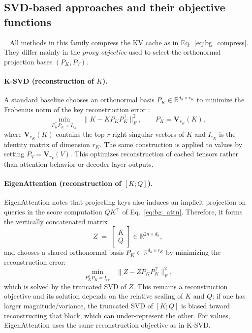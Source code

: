 \subsection{SVD-based approaches and their objective functions}~\label{subsec:backg_svdkvc}
All methods in this family compress the KV cache 
% 
%
as in Eq.~\eqref{eq:bg_compress}. They differ mainly in the \emph{proxy objective} used to select the orthonormal projection bases $(P_K,P_V)$.

\paragraph{K-SVD (reconstruction of $K$).}
A standard baseline chooses an orthonormal basis $P_K\in\mathbb{R}^{d_h\times r_K}$ to minimize the Frobenius norm of the key reconstruction error \citep{asvd,chang2025palu}:
\begin{equation}
\min_{P_K^\top P_K = I_{r_K}}\;\; \|K - K P_K P_K^\top\|_F^2,
\qquad
P_K = \mathbf{V}_{r_K}(K),
\label{eq:bg_ksvd}
\end{equation}
where $\mathbf{V}_{r_K}(K)$ contains the top $r$ right singular vectors of $K$ and $I_{r_K}$ is the identity matrix of dimension $r_K$.
The same construction is applied to values by setting $P_V=\mathbf{V}_{r_V}(V)$.
This optimizes reconstruction of cached tensors rather than attention behavior or decoder-layer outputs.

\paragraph{EigenAttention (reconstruction of $[K;Q]$).}
EigenAttention \citep{saxena2024eigenattention} notes that projecting keys also induces an implicit projection on queries in the score computation $QK^\top$ of Eq.~\ref{eq:bg_attn}.
Therefore, it forms the vertically concatenated matrix
\begin{equation}
Z \;=\; \begin{bmatrix}K\\Q\end{bmatrix}\in\mathbb{R}^{2n\times d_h},
\label{eq:bg_eigen_concat}
\end{equation}
and chooses a shared orthonormal basis $P_K\in\mathbb{R}^{d_h\times r_K}$ by minimizing the reconstruction error:
\begin{equation}
\min_{P_K^\top P_K = I_{r_K}}\;\; \|Z - Z P_K P_K^\top\|_F^2,
\label{eq:bg_eigen}
\end{equation}
which is solved by the truncated SVD of $Z$.
This remains a reconstruction objective and its solution depends on the relative scaling of $K$ and $Q$: if one has larger magnitude/variance, the truncated SVD of $[K;Q]$ is biased toward reconstructing that block, which can under-represent the other. For values, EigenAttention uses the same reconstruction objective as in K-SVD.


